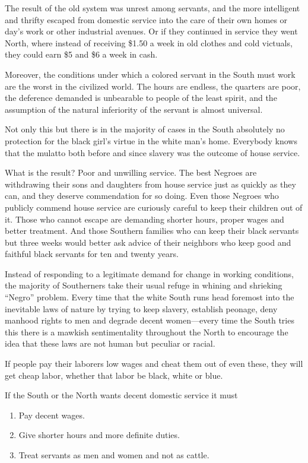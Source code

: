 \documentclass[letterpaper,10pt,english]{jupyterBook}
\begin{document}
\sphinxAtStartPar
The result of the old system was unrest among servants, and the more intelligent and thrifty escaped from domestic service into the care of their own homes or day’s work or other industrial avenues. Or if they continued in service they went North, where instead of receiving \$1.50 a week in old clothes and cold victuals, they could earn \$5 and \$6 a week in cash.

\sphinxAtStartPar
Moreover, the conditions under which a colored servant in the South must work are the worst in the civilized world. The hours are endless, the quarters are poor, the deference demanded is unbearable to people of the least spirit, and the assumption of the natural inferiority of the servant is almost universal.

\sphinxAtStartPar
Not only this but there is in the majority of cases in the South absolutely no protection for the black girl’s virtue in the white man’s home. Everybody knows that the mulatto both before and since slavery was the outcome of house service.

\sphinxAtStartPar
What is the result? Poor and un­willing service. The best Negroes are withdrawing their sons and daughters from house service just as quickly as they can, and they deserve commendation for so doing. Even those Negroes who publicly commend house service are curiously careful to keep their children out of it. Those who cannot escape are demanding shorter hours, proper wages and better treatment. And those Southern families who can keep their black servants but three weeks would better ask advice of their neighbors who keep good and faithful black servants for ten and twenty years.

\sphinxAtStartPar
Instead of responding to a legiti­mate demand for change in working conditions, the majority of South­erners take their usual refuge in whining and shrieking “Negro” problem. Every time that the white South runs head foremost into the inevitable laws of nature by trying to keep slavery, establish peonage, deny manhood rights to men and de­grade decent women—every time the
South tries this there is a mawkish sentimentality throughout the North to encourage the idea that these laws are not human but peculiar or racial.

\sphinxAtStartPar
If people pay their laborers low wages and cheat them out of even these, they will get cheap labor, whether that labor be black, white or blue.

\sphinxAtStartPar
If the South or the North wants de­cent domestic service it must
\begin{enumerate}
%
\item {} 
\sphinxAtStartPar
Pay decent wages.

\item {} 
\sphinxAtStartPar
Give shorter hours and more definite duties.

\item {} 
\sphinxAtStartPar
Treat servants as men and women and not as cattle.

\end{enumerate}
\end{document}
